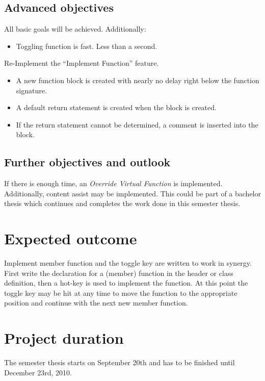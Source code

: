 \subsection{Advanced objectives}
All basic goals will be achieved. Additionally:
\begin{itemize}
 \item Toggling function is fast. Less than a second.
\end{itemize}

Re-Implement the ``Implement Function'' feature.
\begin{itemize}
 \item A new function block is created with nearly no delay right below the
function signature.
 \item A default return statement is created when the block is created.
 \item If the return statement cannot be determined, a comment is inserted into
the block.
\end{itemize}

\subsection{Further objectives and outlook}

If there is enough time, an \textit{Override Virtual Function} is implemented.
Additionally, content assist may be implemented. This could be part of a
bachelor thesis which continues and completes the work done in this semester
thesis.

\section{Expected outcome}

Implement member function and the toggle key are written to work in synergy.
First write the declaration for a (member) function in the header or class
definition, then a hot-key is used to implement the function. At this point the
toggle key may be hit at any time to move the function to the appropriate
position and continue with the next new member function.

\section{Project duration}
The semester thesis starts on September 20th and has to be finished until
December 23rd, 2010.

